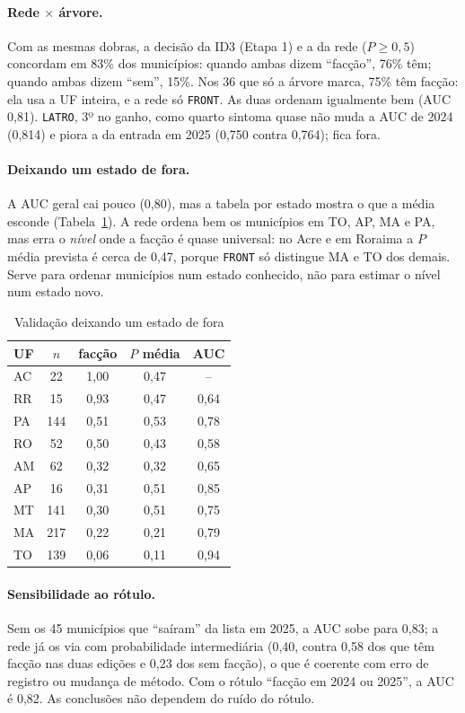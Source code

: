 \documentclass[article,12pt,oneside,a4paper,brazil,sumario=tradicional]{abntex2}
\newcommand{\fonteautores}{\fonte{Elaborada pelos autores (2026).}}
\begin{document}
\paragraph{Rede $\times$ árvore.} Com as mesmas dobras, a decisão da ID3 (Etapa 1) e a da rede
($P\ge0{,}5$) concordam em 83\% dos municípios: quando ambas dizem ``facção'', 76\% têm;
quando ambas dizem ``sem'', 15\%. Nos 36 que só a árvore marca, 75\% têm facção: ela usa a
UF inteira, e a rede só \texttt{FRONT}. As duas ordenam igualmente bem (AUC 0,81).
\texttt{LATRO}, 3º no ganho, como quarto sintoma quase não muda a AUC de 2024 (0,814) e piora
a da entrada em 2025 (0,750 contra 0,764); fica fora.

\paragraph{Deixando um estado de fora.} A AUC geral cai pouco (0,80), mas a tabela por
estado mostra o que a média esconde (Tabela~\ref{tab:uf}). A rede ordena bem os municípios
em TO, AP, MA e PA, mas erra o \emph{nível} onde a facção é quase universal: no Acre e em
Roraima a $P$ média prevista é cerca de 0,47, porque \texttt{FRONT} só distingue MA e TO dos
demais. Serve para ordenar municípios num estado conhecido, não para estimar o nível num
estado novo.

\begin{table}[htbp]
\centering\small
\caption{Validação deixando um estado de fora}\label{tab:uf}
\begin{tabular}{@{}lcccc@{}}
\toprule
UF & $n$ & facção & $P$ média & AUC\\
\midrule
AC & 22 & 1,00 & 0,47 & --\\
RR & 15 & 0,93 & 0,47 & 0,64\\
PA & 144 & 0,51 & 0,53 & 0,78\\
RO & 52 & 0,50 & 0,43 & 0,58\\
AM & 62 & 0,32 & 0,32 & 0,65\\
AP & 16 & 0,31 & 0,51 & 0,85\\
MT & 141 & 0,30 & 0,51 & 0,75\\
MA & 217 & 0,22 & 0,21 & 0,79\\
TO & 139 & 0,06 & 0,11 & 0,94\\
\bottomrule
\end{tabular}
\fonteautores
\end{table}

\paragraph{Sensibilidade ao rótulo.} Sem os 45 municípios que ``saíram'' da lista em 2025,
a AUC sobe para 0,83; a rede já os via com probabilidade intermediária (0,40, contra 0,58
dos que têm facção nas duas edições e 0,23 dos sem facção), o que é coerente com erro de
registro ou mudança de método. Com o rótulo ``facção em 2024 ou 2025'', a AUC é 0,82. As
conclusões não dependem do ruído do rótulo.
\end{document}
